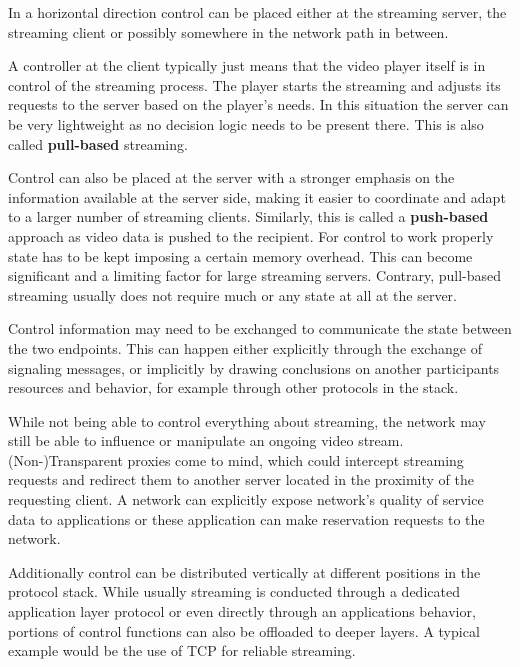 In a horizontal direction control can be placed either at the streaming server, the streaming client or possibly somewhere in the network path in between.

A controller at the client typically just means that the video player itself is in control of the streaming process. The player starts the streaming and adjusts its requests to the server based on the player's needs. In this situation the server can be very lightweight as no decision logic needs to be present there. This is also called \textbf{pull-based} streaming.

Control can also be placed at the server with a stronger emphasis on the information available at the server side, making it easier to coordinate and adapt to a larger number of streaming clients. Similarly, this is called a \textbf{push-based} approach as video data is pushed to the recipient. 
For control to work properly state has to be kept imposing a certain memory overhead. This can become significant and a limiting factor for large streaming servers. Contrary, pull-based streaming usually does not require much or any state at all at the server.

Control information may need to be exchanged to communicate the state between the two endpoints. This can happen either explicitly through the exchange of signaling messages, or implicitly by drawing conclusions on another participants resources and behavior, for example through other protocols in the stack.

While not being able to control everything about streaming, the network may still be able to influence or manipulate an ongoing video stream. (Non-)Transparent proxies come to mind, which could intercept streaming requests and redirect them to another server located in the proximity of the requesting client.  A network can explicitly expose network's quality of service data to applications or these application can make reservation requests to the network.

Additionally control can be distributed vertically at different positions in the protocol stack. While usually streaming is conducted through a dedicated application layer protocol or even directly through an applications behavior, portions of control functions can also be offloaded to deeper layers. A typical example would be the use of \gls{TCP} for reliable streaming.

